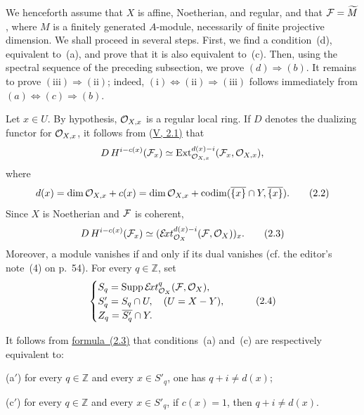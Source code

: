 \medskip
We henceforth assume that $X$ is affine, Noetherian, and regular, and that
$\cF=\widetilde M$, where $M$ is a finitely generated $A$-module, necessarily
of finite projective dimension. We shall proceed in several steps. First, we
find a condition~(d), equivalent to~(a), and prove that it is also equivalent
to~(c). Then, using the spectral sequence of the preceding subsection, we
prove $(d)\Rightarrow(b)$. It remains to prove
$(\mathrm{iii})\Rightarrow(\mathrm{ii})$; indeed,
$(\mathrm{i})\Leftrightarrow(\mathrm{ii})\Rightarrow(\mathrm{iii})$ follows
immediately from $(a)\Leftrightarrow(c)\Rightarrow(b)$.

Let $x\in U$. By hypothesis, $\mathcal O_{X,x}$ is a regular local ring. If $D$
denotes the dualizing functor for $\mathcal O_{X,x}$, it follows from (\hyperref[V.2.1]{V, 2.1)} that
\[
  D\,H^{i-c(x)}(\cF_x)\simeq
  \operatorname{Ext}^{d(x)-i}_{\cO_{X,x}}(\cF_x,\cO_{X,x}),
\]
where
\begin{equation}\label{eq:VIII.2.2}
  d(x)=\dim\mathcal O_{X,x}+c(x)
      =\dim\mathcal O_{X,x}
       +\operatorname{codim}(\overline{\{x\}}\cap Y,\overline{\{x\}}).
  \tag{2.2}
\end{equation}
Since $X$ is Noetherian and $\cF$ is coherent,
\begin{equation}\label{eq:VIII.2.3}
  D\,H^{i-c(x)}(\cF_x)\simeq
  (\sExt^{d(x)-i}_{\cO_X}(\cF,\cO_X))_x.
  \tag{2.3}
\end{equation}
Moreover, a module vanishes if and only if its dual vanishes (cf. the
editor's note~(4) on p.~54). For every $q\in\mathbb Z$, set
\begin{equation}\label{eq:VIII.2.4}
  \begin{cases}
    S_q=\Supp\sExt^q_{\cO_X}(\cF,\cO_X),\\
    S'_q=S_q\cap U,\quad (U=X-Y),\\
    Z_q=\overline{S'_q}\cap Y.
  \end{cases}
  \tag{2.4}
\end{equation}

\medskip
It follows from \hyperref[eq:VIII.2.3]{formula~(2.3)} that conditions~(a) and~(c) are respectively
equivalent to:

\medskip
\noindent\textup{(a$'$)} for every $q\in\mathbb Z$ and every $x\in S'_q$,
one has $q+i\ne d(x)$;

\smallskip
\noindent\textup{(c$'$)} for every $q\in\mathbb Z$ and every $x\in S'_q$,
if $c(x)=1$, then $q+i\ne d(x)$.

